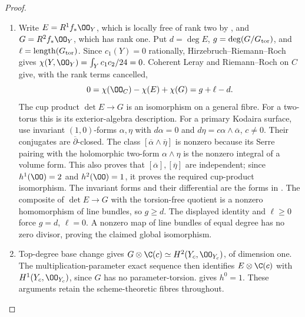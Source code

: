 \begin{proof}

\begin{enumerate}[label={$\langle1\rangle$\arabic*.},leftmargin=*]
\item Write $E=R^1f_*\OO_Y$, which is locally free of rank two by ,
and $G=R^2f_*\OO_Y$, which has rank one. Put
$d=\deg E$, $g=\deg(G/G_{\rm tor})$, and
$\ell=\operatorname{length}(G_{\rm tor})$.
Since $c_1(Y)=0$ rationally, Hirzebruch--Riemann--Roch gives
$\chi(Y,\OO_Y)=\int_Yc_1c_2/24=0$.
Coherent Leray and Riemann--Roch on $C$ give, with the rank terms
cancelled,
\[
0=\chi(\OO_C)-\chi(E)+\chi(G)=g+\ell-d.
\]
The cup product $\det E\to G$ is an isomorphism on a general
fibre. For a two-torus this is its exterior-algebra description.
For a primary Kodaira surface, use invariant $(1,0)$-forms
$\alpha,\eta$ with $d\alpha=0$ and
$d\eta=c\alpha\wedge\overline\alpha$, $c\ne0$.
Their conjugates are $\overline\partial$-closed. The class
$[\overline\alpha\wedge\overline\eta]$ is nonzero because its
Serre pairing with the holomorphic two-form $\alpha\wedge\eta$
is the nonzero integral of a volume form. This also proves that
$[\overline\alpha],[\overline\eta]$ are independent; since
$h^1(\OO)=2$ and $h^2(\OO)=1$, it proves the required cup-product
isomorphism. The invariant forms and their differential are
the forms in \cite[\S3, equations (9)--(12)]{Borcea1984}.
The composite of $\det E\to G$ with the torsion-free quotient is a
nonzero homomorphism of line bundles, so $g\geq d$. The displayed
identity and $\ell\geq0$ force $g=d$, $\ell=0$. A nonzero map
of line bundles of equal degree has no zero divisor, proving the
claimed global isomorphism.

\item Top-degree base change gives
$G\otimes\C(c)\simeq H^2(Y_c,\OO_{Y_c})$, of dimension one.
The multiplication-parameter exact sequence then identifies
$E\otimes\C(c)$ with $H^1(Y_c,\OO_{Y_c})$, since $G$ has no
parameter-torsion.  gives $h^0=1$. These arguments retain the
scheme-theoretic fibres throughout.

\end{enumerate}
\end{proof}
